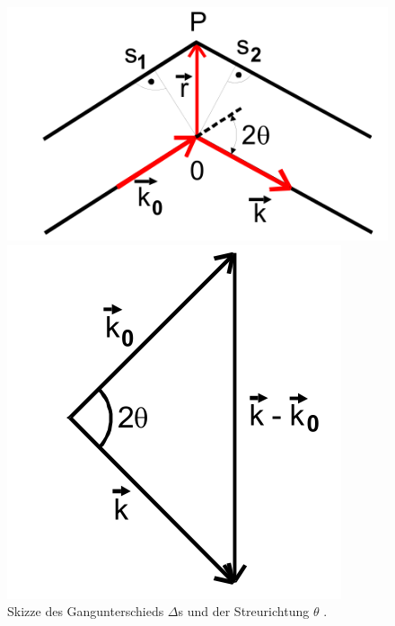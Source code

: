 \begin{figure}[h]
	\begin{minipage}[t]{0.45\textwidth}
		\includegraphics[width = \textwidth]{Abbildungen/streuung}
	\end{minipage}
	\begin{minipage}[t]{0.45\textwidth}
		\includegraphics[width = \textwidth]{Abbildungen/streuwinkel}	
	\end{minipage}
	\caption{Skizze des Gangunterschieds $\Delta$s und der Streurichtung $\theta$ \cite{Anleitung}. }
	\label{fig:streuung}
\end{figure}
